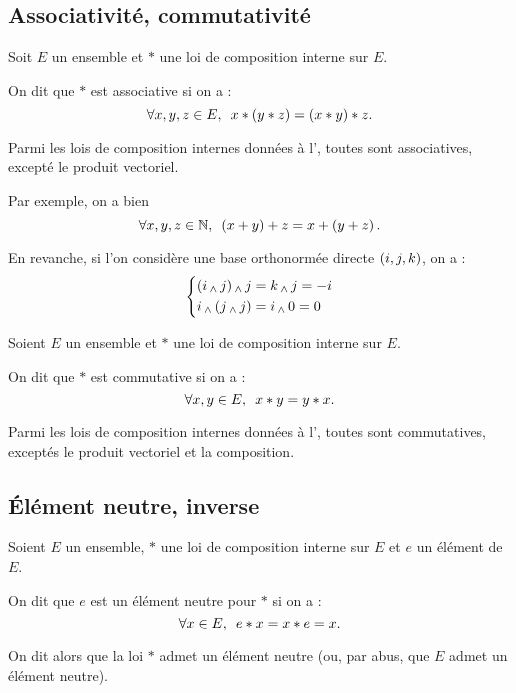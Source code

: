 \subsection{Associativité, commutativité}

\begin{defi}
Soit \(E\) un ensemble et \(*\) une loi de composition interne sur \(E\).

On dit que \(*\) est associative si on a : \[\quantifs{\forall x,y,z\in E}x*\paren{y*z}=\paren{x*y}*z.\]
\end{defi}

\begin{ex}
Parmi les lois de composition internes données à l', toutes sont associatives, excepté le produit vectoriel.

Par exemple, on a bien \[\quantifs{\forall x,y,z\in\N}\paren{x+y}+z=x+\paren{y+z}.\]

En revanche, si l'on considère une base orthonormée directe \(\left(i,j,k\right)\), on a : \[\begin{dcases}\left(i\operatorname{_\wedge} j\right)\operatorname{_\wedge} j=k\operatorname{_\wedge} j=-i \\ i\operatorname{_\wedge}\left(j\operatorname{_\wedge} j\right)=i\operatorname{_\wedge}0=0\end{dcases}\]
\end{ex}

\begin{defi}
Soient \(E\) un ensemble et \(*\) une loi de composition interne sur \(E\).

On dit que \(*\) est commutative si on a : \[\quantifs{\forall x,y\in E}x*y=y*x.\]
\end{defi}

\begin{ex}
Parmi les lois de composition internes données à l', toutes sont commutatives, exceptés le produit vectoriel et la composition.
\end{ex}

\subsection{Élément neutre, inverse}

\begin{defi}
Soient \(E\) un ensemble, \(*\) une loi de composition interne sur \(E\) et \(e\) un élément de \(E\).

On dit que \(e\) est un élément neutre pour \(*\) si on a : \[\quantifs{\forall x\in E}e*x=x*e=x.\]

On dit alors que la loi \(*\) admet un élément neutre (ou, par abus, que \(E\) admet un élément neutre).
\end{defi}

